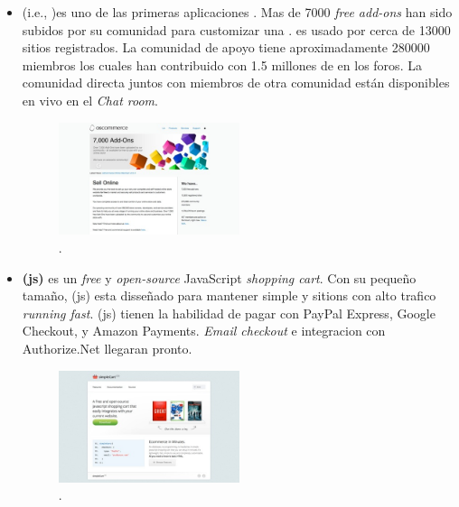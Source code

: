 \begin{itemize}
	\item \textbf{\nameOsCommerce} (i.e., \opensource \commerce)es uno de las primeras aplicaciones \ecommerce \opensource. Mas de 7000 \textit{free add-ons} han sido subidos por su comunidad para customizar una \store \online. \nameOsCommerce es usado por cerca de 13000 sitios registrados. La comunidad de apoyo tiene aproximadamente 280000 miembros los cuales han contribuido con 1.5 millones de \posts en los foros. La comunidad directa juntos con miembros de otra comunidad están disponibles en vivo en el \textit{Chat room}.

	\begin{figure}[H]
		\centering
		\includegraphics[width=0.5\textwidth]{figuras/cap1/osCommerceWebsite.jpg}
		\caption{\nameOsCommerce \website \cite{online_osCommerce}.}
	\end{figure}

	\item \textbf{\nameSimpleCart (js)} es un \textit{free} y \textit{open-source} JavaScript \textit{shopping cart}. Con su pequeño tamaño, \nameSimpleCart(js) esta disseñado para mantener simple  y sitions con alto trafico \textit{running fast}. \nameSimpleCart(js) tienen la habilidad de pagar con PayPal Express, Google Checkout, y Amazon Payments. \textit{Email checkout} e integracion con  Authorize.Net llegaran pronto.
	
	\begin{figure}[H]
		\centering
		\includegraphics[width=0.5\textwidth]{figuras/cap1/simpleCartWebsite.jpg}
		\caption{\nameSimpleCart \website\cite{online_simpleCart}.}
	\end{figure}


\end{itemize}
